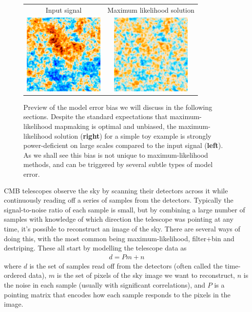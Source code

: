 \documentclass[twocolumn,apj]{aastex63}
\newcommand{\dfn}[1]{\textbf{#1}}
\newenvironment{closetabcols}[1][0.5mm]{\setlength{\tabcolsep}{#1}}{}
\begin{document}
\begin{figure}
	\centering
	\begin{closetabcols}
	\begin{tabular}{cc}
		Input signal & Maximum likelihood solution \\
		\includegraphics[width=40mm]{subpix/toy2d_input_signal_map.png} &
		\includegraphics[width=40mm]{subpix/toy2d_ml_nn_signal_map.png} \\
	\end{tabular}
	\end{closetabcols}
	\caption{Preview of the model error bias we will discuss in the following
	sections. Despite the standard expectations that maximum-likelihood mapmaking
	is optimal and unbiased, the maximum-likelihood solution (\dfn{right})
	for a simple toy example is strongly power-deficient on large scales
	compared to the input signal (\dfn{left}). As we shall see this bias
	is not unique to maximum-likelihood methods, and can be triggered by
	several subtle types of model error.}
	\label{fig:maps-2d}
\end{figure}

CMB telescopes observe the sky by scanning their detectors across
it while continuously reading off a series of samples from the
detectors. Typically the signal-to-noise ratio of each sample is
small, but by combining a large number of samples with knowledge
of which direction the telescope was pointing at any time, it's
possible to reconstruct an image of the sky. There are several
ways of doing this, with the most common being maximum-likelihood,
filter+bin and destriping. These all start by modelling the
telescope data as \citep{tegmark-mapmaking}
\begin{align}
	d = Pm + n \label{eq:model}
\end{align}
where $d$ is the set of samples read off from the detectors
(often called the time-ordered data), $m$ is the set of pixels
of the sky image we want to reconstruct, $n$ is the noise
in each sample (usually with significant correlations), and
$P$ is a pointing matrix that encodes how each sample responds
to the pixels in the image.
\end{document}
